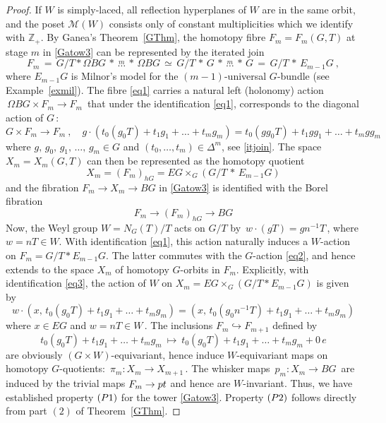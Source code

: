 \documentclass[11pt]{amsart}
\theoremstyle{definition}
\theoremstyle{remark}
\numberwithin{equation}{section}
\newcommand{\la}{\label}
\newcommand{\into}{\hookrightarrow}
\def\M{\mathcal{M}}
\def\Z{\mathbb{Z}}
\begin{document}
%
\begin{proof} 
If $W$ is simply-laced, all reflection hyperplanes of $W$ are in the same orbit, and the poset $\M(W)$ consists
only of constant multiplicities which we identify with $ \Z_+ $. By Ganea's Theorem~\ref{GThm}, the homotopy fibre $ F_m = F_m(G,T)$  at stage $m$ in \eqref{Gatow3} can be represented by 
the iterated join
%
\begin{equation}
\la{eq1}
F_m \, = \,G/T \ast \Omega BG \,\ast\, \stackrel{m}{\ldots} \,\ast\, \Omega BG
\,\simeq\, G/T\, \ast\,  G \,\ast\, \stackrel{m}{\ldots} \,\ast\, G \,=\, G/T\, \ast\,  E_{m-1}G\ ,
\end{equation}
%
where $E_{m-1}G $ is Milnor's model for the  $(m-1)$-universal $G$-bundle (see Example~\ref{exmil}).
The fibre \eqref{eq1} carries a natural left (holonomy) action $\,\Omega BG \times F_m \to F_m \,$ that under the identification \eqref{eq1}, corresponds to the diagonal action of $G\,$:
%
\begin{equation}
\la{eq2}
G \times F_m \to F_m\ ,\quad  g\cdot(t_0(g_0 T) + t_1 g_1 + \ldots + t_m g_m) =  t_0(g g_0 T) + t_1 gg_1 + \ldots + t_m gg_m
\end{equation}
%
where $g,\,g_0,\,g_1,\,\ldots,\, g_m \in G $ and $(t_0,\ldots, t_m) \in \Delta^m $, see \eqref{itjoin}.
The space $ X_m = X_m(G,T) $ can then be represented as the homotopy quotient
%
\begin{equation}
\la{eq3}
X_m = (F_m)_{hG} =  EG \times_G (G/T\, \ast\,  E_{m-1}G)
\end{equation}
%
and the fibration $ F_m \to X_m \to BG $ in \eqref{Gatow3} is identified with the Borel fibration
%
\begin{equation}
\la{eq4}
F_m \to (F_m)_{hG} \to BG
\end{equation}
%
Now, the Weyl group $ W = N_G(T)/T $ acts on 
$ G/T $ by $\,w\cdot(gT) = g n^{-1} T\,$, where $ w = nT \in W $. With identification \eqref{eq1}, this action naturally induces a $W$-action on $ F_m = G/T \ast E_{m-1}G $. The latter commutes with the $G$-action \eqref{eq2}, and hence extends to the space $X_m$ of homotopy $G$-orbits in $F_m $. Explicitly, with identification \eqref{eq3}, the action of $W$ on
$ X_m = EG \times _G (G/T \ast E_{m-1} G) $ is given by
%
\begin{equation}
\la{eq5}
w\cdot(x,\,t_0(g_0 T) + t_1 g_1 + \ldots + t_m g_m) =
(x,\,t_0(g_0 n^{-1} T) + t_1 g_1 + \ldots + t_m g_m)
\end{equation}
%
where $x \in EG$ and $w = n T \in W\,$. The inclusions
$ F_m \into F_{m+1} $ defined by 
%
$$
t_0(g_0 T) + t_1 g_1 + \ldots + t_m g_m\ \mapsto\
t_0(g_0 T) + t_1 g_1 + \ldots + t_m g_m + 0\, e
$$
%
are obviously $ (G \times W)$-equivariant, hence induce $W$-equivariant maps on homotopy $G$-quotients:
$\, \pi_m: X_m \to X_{m+1} \,$.  The whisker maps $\,p_m: X_m \to BG \,$ are induced by the trivial maps $ F_m \to {\rm pt} $ and hence are $W$-invariant. Thus, we have established property $({\rm P1})$ for the tower \eqref{Gatow3}. Property $({\rm P2})$
follows directly from part $(2)$ of Theorem~\ref{GThm}.  


\end{proof}
\end{document}
